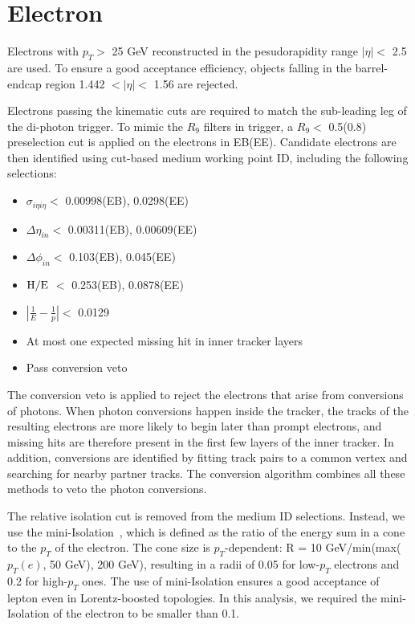 \documentclass[thesis.tex]{subfiles}
\renewcommand\_{\textunderscore\allowbreak}
\begin{document}
\section{Electron}
\label{sec:electronID} 
Electrons with  $p_{T} >$ 25 GeV reconstructed in the pesudorapidity range $|\eta| <$ 2.5 are used. To ensure a good acceptance efficiency, objects falling in the barrel-endcap region 1.442 $< |\eta| <$ 1.56 are rejected. 

Electrons passing the kinematic cuts are required to match the sub-leading leg of the di-photon trigger. 
To mimic the $R_9$ filters in trigger, a $R_9 <$ 0.5(0.8) preselection cut is applied on the electrons in EB(EE). 
Candidate electrons are then identified using cut-based medium working point ID, including the following selections:

\begin{center}
\begin{itemize}
\item $\sigma_{i\eta i\eta} <$ 0.00998(EB), 0.0298(EE)
\item $\Delta\eta_{in} <$ 0.00311(EB), 0.00609(EE)
\item $\Delta\phi_{in} <$ 0.103(EB), 0.045(EE)
\item $\mathrm{H/E}$ $<$ 0.253(EB), 0.0878(EE)
\item $|\frac{1}{E} - \frac{1}{p}| <$ 0.0129
\item At most one expected missing hit in inner tracker layers
\item Pass conversion veto
\end{itemize}
\end{center}

The conversion veto is applied to reject the electrons that arise from conversions of photons.
When photon conversions happen inside the tracker, the tracks of the resulting electrons are more likely to begin later than prompt electrons, and missing hits are therefore present in the first few layers of the inner tracker. 
In addition, conversions are identified by fitting track pairs to a common vertex and searching for nearby partner tracks.
The conversion algorithm combines all these methods to veto the photon conversions.

The relative isolation cut is removed from the medium ID selections. 
Instead, we use the mini-Isolation~\cite{CMS:Isolation}, which is defined as the ratio of the energy sum in a cone to the $p_T$ of the electron.
The cone size is $p_T$-dependent: R = 10 GeV/min(max($p_T(e)$, 50 GeV), 200 GeV), resulting in a radii of 0.05 for low-$p_T$ electrons and 0.2 for high-$p_T$ ones. 
The use of mini-Isolation ensures a good acceptance of lepton even in Lorentz-boosted topologies.
In this analysis, we required the mini-Isolation of the electron to be smaller than 0.1. 
\end{document}
